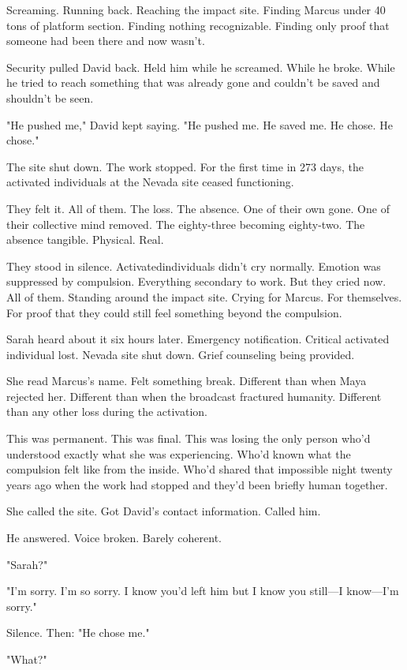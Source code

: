 Screaming. Running back. Reaching the impact site. Finding Marcus under 40 tons of platform section. Finding nothing recognizable. Finding only proof that someone had been there and now wasn't.

Security pulled David back. Held him while he screamed. While he broke. While he tried to reach something that was already gone and couldn't be saved and shouldn't be seen.

"He pushed me," David kept saying. "He pushed me. He saved me. He chose. He chose."

The site shut down. The work stopped. For the first time in 273 days, the activated individuals at the Nevada site ceased functioning.

They felt it. All of them. The loss. The absence. One of their own gone. One of their collective mind removed. The eighty-three becoming eighty-two. The absence tangible. Physical. Real.

They stood in silence. Activatedindividuals didn't cry normally. Emotion was suppressed by compulsion. Everything secondary to work. But they cried now. All of them. Standing around the impact site. Crying for Marcus. For themselves. For proof that they could still feel something beyond the compulsion.

\scenebreak

Sarah heard about it six hours later. Emergency notification. Critical activated individual lost. Nevada site shut down. Grief counseling being provided.

She read Marcus's name. Felt something break. Different than when Maya rejected her. Different than when the broadcast fractured humanity. Different than any other loss during the activation.

This was permanent. This was final. This was losing the only person who'd understood exactly what she was experiencing. Who'd known what the compulsion felt like from the inside. Who'd shared that impossible night twenty years ago when the work had stopped and they'd been briefly human together.

She called the site. Got David's contact information. Called him.

He answered. Voice broken. Barely coherent.

"Sarah?"

"I'm sorry. I'm so sorry. I know you'd left him but I know you still—I know—I'm sorry."

Silence. Then: "He chose me."

"What?"

